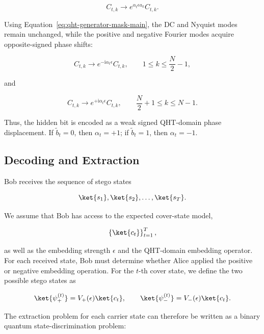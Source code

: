 \documentclass[11pt]{article}
\theoremstyle{plain}
\theoremstyle{definition}
\theoremstyle{remark}
\begin{document}
\begin{equation}
C_{t,k}
\longrightarrow
e^{\alpha_t\epsilon a_k}C_{t,k}.
\end{equation}

Using Equation~\eqref{eq:qht-generator-mask-main}, the DC and Nyquist modes remain unchanged, while the positive and negative Fourier modes acquire opposite-signed phase shifts:

\begin{equation}
C_{t,k}
\longrightarrow
e^{-\mathrm{i}\alpha_t\epsilon}C_{t,k},
\qquad
1\leq k\leq\frac{N}{2}-1,
\end{equation}

and

\begin{equation}
C_{t,k}
\longrightarrow
e^{+\mathrm{i}\alpha_t\epsilon}C_{t,k},
\qquad
\frac{N}{2}+1\leq k\leq N-1.
\end{equation}

Thus, the hidden bit is encoded as a weak signed QHT-domain phase displacement. If $\widetilde{b}_t=0$, then $\alpha_t=+1$; if $\widetilde{b}_t=1$, then $\alpha_t=-1$.

\subsection{Decoding and Extraction}
\label{Sec:decoding}

Bob receives the sequence of stego states

\begin{equation}
\ket{s_1},
\ket{s_2},
\ldots,
\ket{s_T}.
\end{equation}

We assume that Bob has access to the expected cover-state model,

\begin{equation}
\left\{
\ket{c_t}
\right\}_{t=1}^{T},
\end{equation}

as well as the embedding strength $\epsilon$ and the QHT-domain embedding operator. For each received state, Bob must determine whether Alice applied the positive or negative embedding operation. For the $t$-th cover state, we define the two possible stego states as

\begin{equation}
\ket{\psi_{+}^{(t)}}
=
V_{+}(\epsilon)\ket{c_t},
\qquad
\ket{\psi_{-}^{(t)}}
=
V_{-}(\epsilon)\ket{c_t}.
\end{equation}

The extraction problem for each carrier state can therefore be written as a binary quantum state-discrimination problem:
\end{document}
